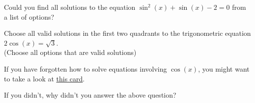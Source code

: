\documentclass{ximera}
\begin{document}
\begin{question}

    Could you find all solutions to the equation $\sin^2(x) + \sin(x) -2 = 0$ from a list of options?
    
    \begin{multipleChoice}
    
    \end{multipleChoice}

\end{question}


\begin{problem} 

\begin{problem}
    Choose all valid solutions in the first two quadrants to the trigonometric equation $2\cos(x) = \sqrt{3}$. \\ (Choose all options that are valid solutions)
    
    \begin{hint}
    If you have forgotten how to solve equations involving $\cos(x)$, you might want to take a look at \href{https://ximera.osu.edu/math160fa17/m160prerequisites/prerequisiteVideos/trigSolvingEquations}{this card}.
    \end{hint}

  \begin{selectAll}
      \choice{$\pi$}
      
      
  \end{selectAll}
  
\end{problem}

\begin{question}
  
  If you didn't, why didn't you answer the above question?
  
  \begin{multipleChoice}
      
  \end{multipleChoice}
  
\end{question}
  
\end{problem}
\end{document}
